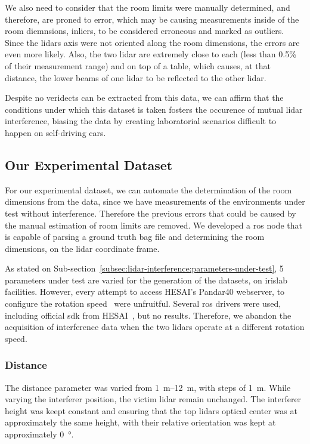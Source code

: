 We also need to consider that the room limits were manually determined, and therefore, are proned to error, which may be causing measurements inside of the room diemnsions, inliers, to be considered erroneous and marked as outliers. Since the \acp{lidar} axis were not oriented along the room dimensions, the errors are even more likely. Also, the two \ac{lidar} are extremely close to each (less than 0.5\% of their measurement range) and on top of a table, which causes, at that distance, the lower beams of one \ac{lidar} to be reflected to the other \ac{lidar}. 

Despite no veridects can be extracted from this data, we can affirm that the conditions under which this dataset is taken fosters the occurence of mutual \ac{lidar} interference, biasing the data by creating laboratorial scenarios difficult to happen on self-driving cars.

\subsection{Our Experimental Dataset}
For our experimental dataset, we can automate the determination of the room dimensions from the data, since we have measurements of the environments under test without interference. Therefore the previous errors that could be caused by the manual estimation of room limits are removed. We developed a \ac{ros} node that is capable of parsing a ground truth bag file and determining the room dimensions, on the \ac{lidar} coordinate frame. 

As stated on Sub-section~\ref{subsec:lidar-interference:parameters-under-test}, 5 parameters under test are varied for the generation of the datasets, on \ac{irislab} facilities. However, every attempt to access HESAI's Pandar40 webserver, to configure the rotation speed~\cite{Pandar40UserGuide} were unfruitful. Several \ac{ros} drivers were used, including official \ac{sdk} from HESAI\cp~, but no results. Therefore, we abandon the acquisition of interference data when the two \acp{lidar} operate at a different rotation speed.


\subsubsection{Distance}
The distance parameter was varied from \SIrange{1}{12}{\meter}, with steps of \SI{1}{\meter}. While varying the interferer position, the victim \ac{lidar} remain unchanged. The interferer height was keept constant and ensuring that the top \acp{lidar} optical center was at approximately the same height, with their relative orientation was kept at approximately \SI{0}{\degree}.


